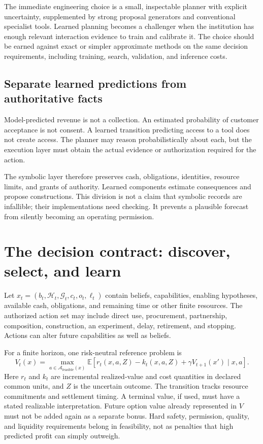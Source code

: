 \documentclass[11pt,letterpaper]{article}
\newcommand{\E}{\mathbb{E}}
\newcommand{\GG}{\mathcal{G}}
\theoremstyle{remark}\newtheorem{remark}{Remark}[section]
\newcommand{\HH}{\mathcal{H}}
\newcommand{\CalA}{\mathcal{A}}
\begin{document}
The immediate engineering choice is a small, inspectable planner with explicit uncertainty, supplemented by strong proposal generators and conventional specialist tools. Learned planning becomes a challenger when the institution has enough relevant interaction evidence to train and calibrate it. The choice should be earned against exact or simpler approximate methods on the same decision requirements, including training, search, validation, and inference costs.

\subsection{Separate learned predictions from authoritative facts}
Model-predicted revenue is not a collection. An estimated probability of customer acceptance is not consent. A learned transition predicting access to a tool does not create access. The planner may reason probabilistically about each, but the execution layer must obtain the actual evidence or authorization required for the action.

The symbolic layer therefore preserves cash, obligations, identities, resource limits, and grants of authority. Learned components estimate consequences and propose constructions. This division is not a claim that symbolic records are infallible; their implementations need checking. It prevents a plausible forecast from silently becoming an operating permission.

\section{The decision contract: discover, select, and learn}\label{sec:decision}
Let $x_t=(b_t,\HH_t,\GG_t,c_t,o_t,\ell_t)$ contain beliefs, capabilities, enabling hypotheses, available cash, obligations, and remaining time or other finite resources. The authorized action set may include direct use, procurement, partnership, composition, construction, an experiment, delay, retirement, and stopping. Actions can alter future capabilities as well as beliefs.

For a finite horizon, one risk-neutral reference problem is
\begin{equation}
V_t(x)=\max_{a\in\CalA_{\mathrm{feasible}}(x)}
\E\!\left[r_t(x,a,Z)-k_t(x,a,Z)+\gamma V_{t+1}(x')\mid x,a\right].
\label{eq:bellman}
\end{equation}
Here $r_t$ and $k_t$ are incremental realized-value and cost quantities in declared common units, and $Z$ is the uncertain outcome. The transition tracks resource commitments and settlement timing. A terminal value, if used, must have a stated realizable interpretation. Future option value already represented in $V$ must not be added again as a separate bonus. Hard safety, permission, quality, and liquidity requirements belong in feasibility, not as penalties that high predicted profit can simply outweigh.
\end{document}
